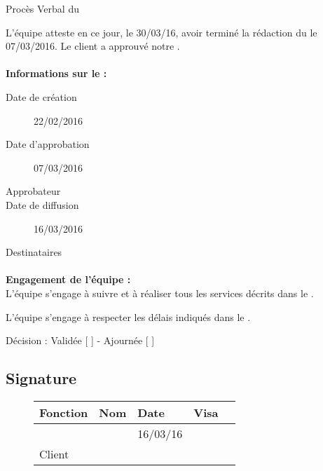 \documentclass[asi, sansVersion]{picInsa}
\begin{document}
 
 \begin{center}
  \LARGE{}
    Procès Verbal du \DSE \\
 \end{center}
 
 \normalsize{}
 
L'équipe \nomEquipe{} atteste en ce jour, le 30/03/16, avoir terminé la rédaction du \DSE le 07/03/2016.
Le client a approuvé notre \DSE.


\paragraph{}
\textbf{Informations sur le \DSECourt{} :}

\begin{description}
  \item[Date de création]22/02/2016
  \item[Date d'approbation]07/03/2016
  \item[Approbateur]\nomClient
  \item[Date de diffusion]16/03/2016
  \item[Destinataires]\nomEquipe
\end{description}

\paragraph{}
\textbf{Engagement de l'équipe :}\\


L'équipe \nomEquipe{} s'engage à suivre et à réaliser tous les services décrits dans le \DSE.


L'équipe \nomEquipe{} s'engage à respecter les délais indiqués dans le \DSE.


\begin{center}
Décision : Validée [ \checkmark{} ] - Ajournée [ ]
\end{center}

\subsection*{Signature}
\begin{figure}[H]
		\centering
		\begin{tabularx}{17cm}{|p{4cm}|X|X|X|X|}
		\hline
		\rowcolor[gray]{0.85} Fonction & Nom & Date & Visa \\
		\hline
		\CP{} & \Sergi{} & 16/03/16 & \\
		\hline
		Client & \nomClient & & \\
		\hline
		\end{tabularx}
\end{figure}
\end{document}
